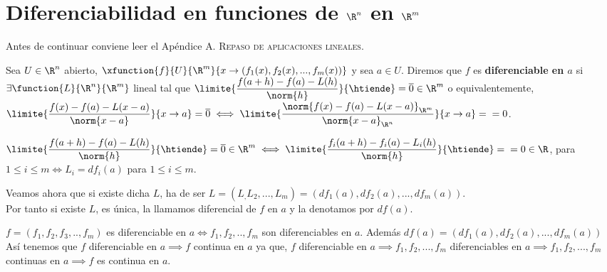 	\section{Diferenciabilidad en funciones de $\R^n$ en $\R^m$}	
	
	\begin{nota} Antes de continuar conviene leer el Apéndice \textsc{A. Repaso de aplicaciones lineales}.\end{nota}
	
	\begin{defi} Sea $U\in \R^n$ abierto, $\xfunction{f}{U}{\R^m}{x\rightarrow(f_1(x),f_2(x),...,f_m(x))}$ y sea $a\in U$. Diremos que $f$ es \textbf{diferenciable en $a$} si $\exists \function{L}{\R^n}{\R^m}$ lineal tal que $\limite{\dfrac{f(a+h)-f(a)-L(h)}{\norm{h}}}{\htiende}=\overline{0}\in\R^m$ o equivalentemente, $\limite{\dfrac{f(x)-f(a)-L(x-a)}{\norm{x-a}}}{x\rightarrow a}=\overline{0}\iff \limite{\dfrac{\norm{f(x)-f(a)-L(x-a)}_{\R^m}}{\norm{x-a}_{\R^n}}}{x\rightarrow a}=\\=0$.
	\begin{observacion} $\limite{\dfrac{f(a+h)-f(a)-L(h)}{\norm{h}}}{\htiende}=\overline{0}\in\R^m\iff \limite{\dfrac{f_i(a+h)-f_i(a)-L_i(h)}{\norm{h}}}{\htiende}=\\=0\in\R$, para $1\leq i\leq m\iff L_i=df_i(a)$ para $1\leq i\leq m$.
	\end{observacion}
	Veamos ahora que si existe dicha $L$, ha de ser $L=(L_,L_2,...,L_m)=(df_1(a),df_2(a),...,df_m(a))$.\\
	Por tanto si existe $L$, es única, la llamamos diferencial de $f$ en $a$ y la denotamos por $df(a)$.
	\begin{observacion}
	$f=(f_1,f_2,f_3,..,f_m)$ es diferenciable en $a\iff f_1,f_2,..,f_m$ son diferenciables en $a$. Además $df(a)=(df_1(a),df_2(a),...,df_m(a))$\\
	Así tenemos que $f$ diferenciable en $a\implies f$ continua en $a$ ya que, $f$ diferenciable en $a\implies f_1,f_2,...,f_m$ diferenciables en $a\implies f_1,f_2,...,f_m$ continuas en $a\implies f$ es continua en $a$.\\
	\end{observacion}
	\end{defi}
	
